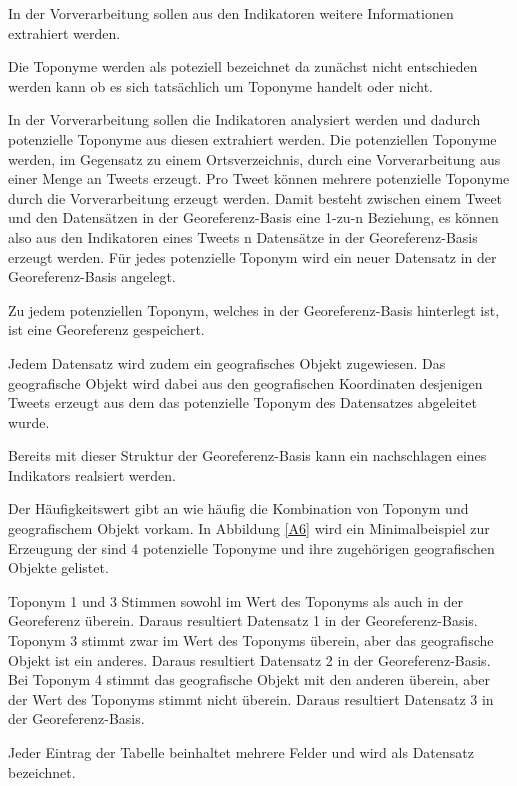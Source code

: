 						In der Vorverarbeitung sollen aus den Indikatoren weitere Informationen extrahiert werden. 

						Die Toponyme werden als poteziell bezeichnet da zunächst nicht entschieden werden kann ob es sich tatsächlich um Toponyme handelt oder nicht. 

						In der Vorverarbeitung sollen die Indikatoren analysiert werden und dadurch potenzielle Toponyme aus diesen extrahiert werden.
						Die potenziellen Toponyme werden, im Gegensatz zu einem Ortsverzeichnis, durch eine Vorverarbeitung aus einer Menge an Tweets erzeugt. 
						Pro Tweet können mehrere potenzielle Toponyme durch die Vorverarbeitung erzeugt werden.
						Damit besteht zwischen einem Tweet und den Datensätzen in der Georeferenz-Basis eine 1-zu-n Beziehung, es können also aus den Indikatoren eines Tweets n Datensätze in der Georeferenz-Basis erzeugt werden. 
						Für jedes potenzielle Toponym wird ein neuer Datensatz in der Georeferenz-Basis angelegt. 


					Zu jedem potenziellen Toponym, welches in der Georeferenz-Basis hinterlegt ist, ist eine Georeferenz gespeichert.

					
					
					Jedem Datensatz wird zudem ein geografisches Objekt zugewiesen.
					Das geografische Objekt wird dabei aus den geografischen Koordinaten desjenigen Tweets erzeugt aus dem das potenzielle Toponym des Datensatzes abgeleitet wurde.

					Bereits mit dieser Struktur der Georeferenz-Basis kann ein nachschlagen eines Indikators realsiert werden. 


					Der Häufigkeitswert gibt an wie häufig die Kombination von Toponym und geografischem Objekt vorkam. 
					In Abbildung \ref{A6} wird ein Minimalbeispiel zur Erzeugung der 
					sind 4 potenzielle Toponyme und ihre zugehörigen geografischen Objekte gelistet.
					
					Toponym 1 und 3 Stimmen sowohl im Wert des Toponyms als auch in der Georeferenz überein. 
					Daraus resultiert Datensatz 1 in der Georeferenz-Basis. 
					Toponym 3 stimmt zwar im Wert des Toponyms überein, aber das geografische Objekt ist ein anderes. 
					Daraus resultiert Datensatz 2 in der Georeferenz-Basis.
					Bei Toponym 4 stimmt das geografische Objekt mit den anderen überein, aber der Wert des Toponyms stimmt nicht überein.
					Daraus resultiert Datensatz 3 in der Georeferenz-Basis.


					Jeder Eintrag der Tabelle beinhaltet mehrere Felder und wird als Datensatz bezeichnet.


